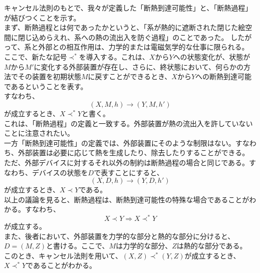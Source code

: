 \documentclass[a4paper,11pt]{jsarticle}
\begin{document}
キャンセル法則のもとで、我々が定義した「断熱到達可能性」と、「断熱過程」が結びつくことを示す。\\
まず、断熱過程とは何であったかというと、「系が熱的に遮断された閉じた絵空間に閉じ込めらえれ、系への熱の流出入を防ぐ過程」のことであった。
したがって、系と外部との相互作用は、力学的または電磁気学的な仕事に限られる。\\
ここで、新たな記号$\prec ^*$を導入する。これは、$X$から$Y$への状態変化が、状態が$M$から$M'$に変化する外部装置が存在し、さらに、終状態において、何らかの方法でその装置を初期状態$M$に戻すことができるとき、$X$から$Y$への断熱到達可能であるということを表す。\\
すなわち、
\begin{equation}
    (X,M,h) \rightarrow (Y,M,h')
\end{equation}
が成立するとき、$X \prec ^* Y$と書く。\\
これは、「断熱過程」の定義と一致する。外部装置が熱の流出入を許していないことに注意されたい。\\

一方「断熱到達可能性」の定義では、外部装置にそのような制限はない。すなわち、外部装置は必要に応じて熱を生成したり、除去したりすることができる。\\
ただ、外部デバイスに対するそれ以外の制約は断熱過程の場合と同じである。すなわち、デバイスの状態を$D$で表すことにすると、
\begin{equation}
    (X,D,h) \rightarrow (Y,D,h')
\end{equation}
が成立するとき、$X \prec Y$である。\\

以上の議論を見ると、断熱過程は、断熱到達可能性の特殊な場合であることがわかる。すなわち、
\begin{equation}
    X \prec Y \Rightarrow X \prec ^* Y
\end{equation}
が成立する。\\
また、後者において、外部装置を力学的な部分と熱的な部分に分けると、$D = (M,Z)$と書ける。ここで、$M$は力学的な部分、$Z$は熱的な部分である。\\
このとき、キャンセル法則を用いて、$(X,Z) \prec^* (Y,Z)$が成立するとき、$X \prec^* Y$であることがわかる。\\
\end{document}
